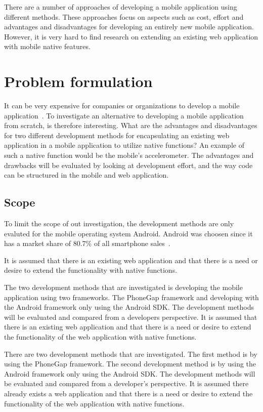There are a number of approaches of developing a mobile application using different methods. These approaches focus on aspects such as cost, effort and advantages and disadvantages for developing an entirely new mobile application. However, it is very hard to find research on extending an existing web application with mobile native features.

\section{Problem formulation}\label{sec:problem-formulation}
It can be very expensive for companies or organizations to develop a mobile application~\cite{kohan2015}. To investigate an alternative to developing a mobile application from scratch, is therefore interesting. What are the advantages and disadvantages for two different development methods for encapsulating an existing web application in a mobile application to utilize native functions? An example of such a native function would be the mobile's accelerometer. The advantages and drawbacks will be evaluated by looking at development effort, and the way code can be structured in the mobile and web application.

\subsection{Scope} \label{subsec:scope}
To limit the scope of out investigation, the development methods are only evaluted for the mobile operating system Android. Android was choosen since it has a market share of 80.7\% of all smartphone sales~\cite{gartner2015}.

It is assumed that there is an existing web application and that there is a need or desire to extend the functionality with native functions.

The two development methods that are investigated is developing the mobile application using two frameworks. The PhoneGap framework and developing with the Android framework only using the Android SDK. The development methods will be evaluated and compared from a developers perspective. It is assumed that there is an existing web application and that there is a need or desire to extend the functionality of the web application with native functions.

There are two development methods that are investigated. The first method is by using the PhoneGap framework. The second development method is by using the Android framework only using the Android SDK. The development methods will be evaluated and compared from a developer's perspective. It is assumed there already exists	a web application and that there is a need or desire to extend the functionality of the web application with native functions.

